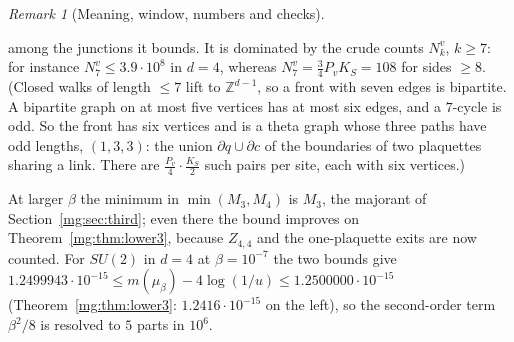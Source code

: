\documentclass[11pt,a4paper]{article}
\theoremstyle{definition}
\theoremstyle{remark}
\newtheorem{remark}[theorem]{Remark}
\newcommand{\Z}{\mathbb{Z}}
\begin{document}
\begin{remark}[Meaning, window, numbers and checks]
\begin{itemize}
among the junctions it bounds. It is dominated by the crude counts $N^v_k$, $k\ge7$: for instance $N^v_7\le3.9\cdot10^8$ in $d=4$, whereas $N^v_7=\frac34P_vK_S=108$ for sides $\ge8$. (Closed walks of length $\le7$ lift to
$\Z^{d-1}$, so a front with seven edges is bipartite. A bipartite graph on at most five vertices has at most six edges, and a $7$-cycle is odd. So the front has six
vertices and is a theta graph whose three paths have odd lengths, $(1,3,3)$: the union $\partial q\cup\partial c$ of the boundaries of two plaquettes sharing a link. There
are $\frac{P_v}4\cdot\frac{K_S}2$ such pairs per site, each with six vertices.)
\end{itemize}
At larger $\beta$ the minimum in $\min(M_3,M_4)$ is $M_3$, the majorant of Section~\ref{mg:sec:third}; even there the bound improves on Theorem~\ref{mg:thm:lower3},
because $Z_{4,4}$ and the one-plaquette exits are now counted. For $SU(2)$ in $d=4$ at $\beta=10^{-7}$ the two bounds give
$1.2499943\cdot10^{-15}\le m(\mu_\beta)-4\log(1/u)\le1.2500000\cdot10^{-15}$ (Theorem~\ref{mg:thm:lower3}: $1.2416\cdot10^{-15}$ on the left), so the second-order term
$\beta^2/8$ is resolved to $5$ parts in $10^6$.


\end{remark}
\end{document}
